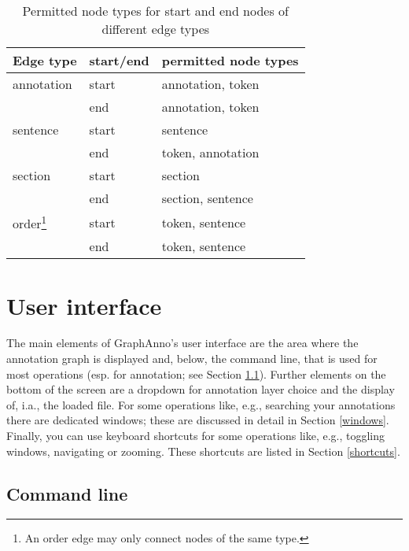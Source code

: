 \documentclass[12pt]{scrartcl}
\begin{document}
\begin{table}[tb]
	\begin{center}
		\begin{minipage}{20em}
			\begin{tabular*}{20em}{@{\extracolsep{\fill}} lll }
				\toprule
				Edge type & start/end & permitted node types\\
				\midrule
				annotation & start & annotation, token\\
				& end & annotation, token\\
				sentence & start & sentence\\
				& end & token, annotation\\
				section & start & section\\
				& end & section, sentence\\
				order\footnote{An order edge may only connect nodes of the same type.} & start & token, sentence\\
				& end & token, sentence\\
				\bottomrule
			\end{tabular*}
		\end{minipage}
	\end{center}
	\caption{Permitted node types for start and end nodes of different edge types}
	\label{edge-types}
\end{table}



\section{User interface}

The main elements of GraphAnno’s user interface are the area where the annotation graph is displayed and, below, the command line, that is used for most operations (esp. for annotation; see Section \ref{commandline}).
Further elements on the bottom of the screen are a dropdown for annotation layer choice and the display of, i.a., the loaded file.
For some operations like, e.g., searching your annotations there are dedicated windows; these are discussed in detail in Section \ref{windows}.
Finally, you can use keyboard shortcuts for some operations like, e.g., toggling windows, navigating or zooming.
These shortcuts are listed in Section \ref{shortcuts}.


\subsection{Command line}\label{commandline}
\end{document}
